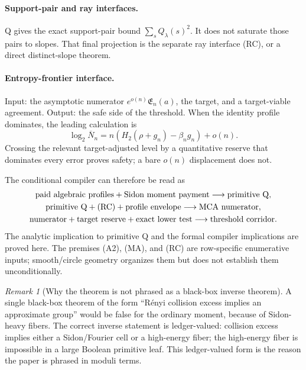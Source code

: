 \documentclass[12pt,a4paper]{amsart}
\numberwithin{equation}{section}
\theoremstyle{remark}
\newtheorem{remark}[remark]{Remark}
\newcommand{\barN}{\overline N}
\newcommand{\Renyi}{R\'enyi}
\begin{document}
\paragraph{Support-pair and ray interfaces.}
Q gives the exact support-pair bound \(\sum_sQ_\lambda(s)^2\).  It does
not saturate those pairs to slopes.  That final projection is the separate
ray interface \textup{(RC)}, or a direct distinct-slope theorem.

\paragraph{Entropy-frontier interface.}
Input: the asymptotic numerator \(e^{o(n)}\mathfrak E_n(a)\), the target,
and a target-viable agreement.  Output: the safe side of the threshold.
When the identity profile dominates, the leading calculation is
\[
        \log_2\barN_n=n(H_2(\rho+g_n)-\beta_ng_n)+o(n).
\]
Crossing the relevant target-adjusted level by a quantitative reserve that
dominates every error proves safety; a bare \(o(n)\) displacement does not.

The conditional compiler can therefore be read as
\[
\begin{gathered}
\text{paid algebraic profiles}
+\text{Sidon moment payment}
\longrightarrow \text{primitive Q},\\
\text{primitive Q}+\textup{(RC)}
+\text{profile envelope}
\longrightarrow \text{MCA numerator},\\
\text{numerator}+\text{target reserve}+\text{exact lower test}
\longrightarrow \text{threshold corridor}.
\end{gathered}
\]
The analytic implication to primitive Q and the formal compiler implications
are proved here.  The premises \textup{(A2)}, \textup{(MA)}, and
\textup{(RC)} are row-specific enumerative inputs; smooth/circle geometry
organizes them but does not establish them unconditionally.

\begin{remark}[Why the theorem is not phrased as a black-box inverse theorem]
A single black-box theorem of the form ``\Renyi{} collision excess implies an approximate group'' would be false for the ordinary moment, because of Sidon-heavy fibers.  The correct inverse statement is ledger-valued: collision excess implies either a Sidon/Fourier cell or a high-energy fiber; the high-energy fiber is impossible in a large Boolean primitive leaf.  This ledger-valued form is the reason the paper is phrased in moduli terms.
\end{remark}
\end{document}
